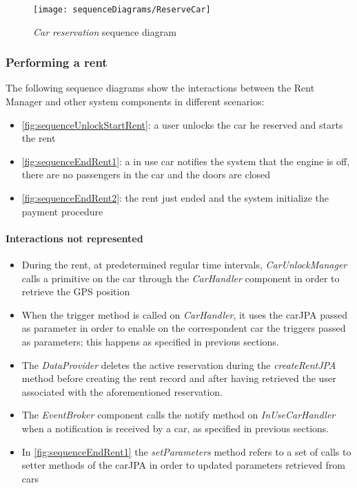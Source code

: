 \begin{figure}[h!]
	\centering
	\texttt{[image: sequenceDiagrams/ReserveCar]}
	\caption{
		\label{fig:sequenceCarReservation} 
		\emph{Car reservation} sequence diagram
	}
\end{figure}

\clearpage
\subsubsection{Performing a rent}
The following sequence diagrams show the interactions between the \mbox{Rent} \mbox{Manager} and other system components in different scenarios:
\begin{itemize}
	\item \autoref{fig:sequenceUnlockStartRent}: a user unlocks the car he reserved and starts the rent
	\item \autoref{fig:sequenceEndRent1}: a in use car notifies the system that the engine is off, there are no passengers in the car and the doors are closed
	\item \autoref{fig:sequenceEndRent2}: the rent just ended and the system initialize the payment procedure
\end{itemize}

\paragraph{Interactions not represented}
\begin{itemize}
	\item During the rent, at predetermined regular time intervals, \emph{CarUnlockManager} calls a primitive on the car through the \emph{CarHandler} component in order to retrieve the GPS position
	
	\item When the trigger method is called on \emph{CarHandler}, it uses the carJPA passed as parameter in order to enable on the correspondent car the triggers passed as parameters; this happens as specified in previous sections.
	
	\item The \emph{DataProvider} deletes the active reservation during the \emph{createRentJPA} method before creating the rent record and after having retrieved the user associated with the aforementioned reservation.
	
	\item The \emph{EventBroker} component calls the notify method on \emph{InUseCarHandler} when a notification is received by a car, as specified in previous sections.
	
	\item In \autoref{fig:sequenceEndRent1} the \emph{setParameters} method refers to a set of calls to setter methods of the carJPA in order to updated parameters retrieved from cars
\end{itemize}


